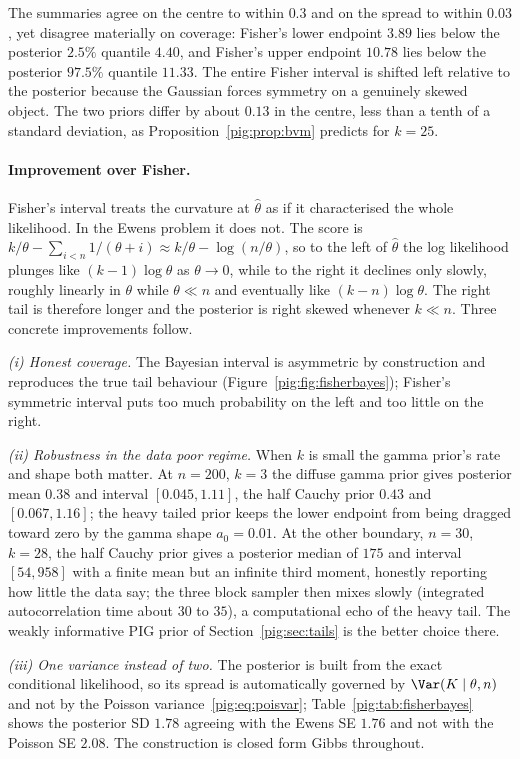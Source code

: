 The summaries agree on the centre to within $0.3$ and on the spread to within $0.03$, yet disagree materially on coverage: Fisher's lower endpoint $3.89$ lies below the posterior $2.5\%$ quantile $4.40$, and Fisher's upper endpoint $10.78$ lies below the posterior $97.5\%$ quantile $11.33$. The entire Fisher interval is shifted left relative to the posterior because the Gaussian forces symmetry on a genuinely skewed object. The two priors differ by about $0.13$ in the centre, less than a tenth of a standard deviation, as Proposition~\ref{pig:prop:bvm} predicts for $k=25$.

\paragraph{Improvement over Fisher.} Fisher's interval treats the curvature at $\hat\theta$ as if it characterised the whole likelihood. In the Ewens problem it does not. The score is $k/\theta-\sum_{i<n}1/(\theta+i)\approx k/\theta-\log(n/\theta)$, so to the left of $\hat\theta$ the log likelihood plunges like $(k-1)\log\theta$ as $\theta\to0$, while to the right it declines only slowly, roughly linearly in $\theta$ while $\theta\ll n$ and eventually like $(k-n)\log\theta$. The right tail is therefore longer and the posterior is right skewed whenever $k\ll n$. Three concrete improvements follow.

\emph{(i) Honest coverage.} The Bayesian interval is asymmetric by construction and reproduces the true tail behaviour (Figure~\ref{pig:fig:fisherbayes}); Fisher's symmetric interval puts too much probability on the left and too little on the right.

\emph{(ii) Robustness in the data poor regime.} When $k$ is small the gamma prior's rate and shape both matter. At $n=200$, $k=3$ the diffuse gamma prior gives posterior mean $0.38$ and interval $[0.045, 1.11]$, the half Cauchy prior $0.43$ and $[0.067, 1.16]$; the heavy tailed prior keeps the lower endpoint from being dragged toward zero by the gamma shape $a_0=0.01$. At the other boundary, $n=30$, $k=28$, the half Cauchy prior gives a posterior median of $175$ and interval $[54, 958]$ with a finite mean but an infinite third moment, honestly reporting how little the data say; the three block sampler then mixes slowly (integrated autocorrelation time about $30$ to $35$), a computational echo of the heavy tail. The weakly informative PIG prior of Section~\ref{pig:sec:tails} is the better choice there.

\emph{(iii) One variance instead of two.} The posterior is built from the exact conditional likelihood, so its spread is automatically governed by $\Var(K\mid\theta,n)$ and not by the Poisson variance~\eqref{pig:eq:poisvar}; Table~\ref{pig:tab:fisherbayes} shows the posterior SD $1.78$ agreeing with the Ewens SE $1.76$ and not with the Poisson SE $2.08$. The construction is closed form Gibbs throughout.

